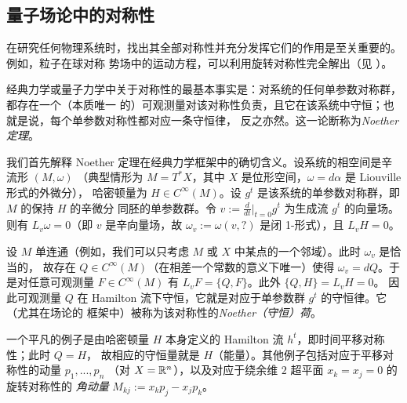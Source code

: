 
\subsection{量子场论中的对称性}

在研究任何物理系统时，找出其全部对称性并充分发挥它们的作用是至关重要的。例如，粒子在球对称
势场中的运动方程，可以利用旋转对称性完全解出（见 \cite{A}）。

经典力学或量子力学中关于对称性的最基本事实是：对系统的任何单参数对称群，都存在一个（本质唯一
的）可观测量对该对称性负责，且它在该系统中守恒；也就是说，每个单参数对称性都对应一条守恒律，
反之亦然。这一论断称为\emph{Noether 定理}。

我们首先解释 Noether 定理在经典力学框架中的确切含义。设系统的相空间是辛流形 $(M,\omega)$
（典型情形为 $M=T^*X$，其中 $X$ 是位形空间，$\omega=d\alpha$ 是 Liouville 形式的外微分），
哈密顿量为 $H\in C^\infty(M)$。设 $g^t$ 是该系统的单参数对称群，即 $M$ 的保持 $H$ 的辛微分
同胚的单参数群。令 $v:=\frac{d}{dt}|_{t=0}g^t$ 为生成流 $g^t$ 的向量场。则有
$L_v \omega=0$（即 $v$ 是辛向量场，故 $\omega_v:=\omega(v,?)$ 是闭 1-形式），且 $L_v H=0$。

设 $M$ 单连通（例如，我们可以只考虑 $M$ 或 $X$ 中某点的一个邻域）。此时 $\omega_v$ 是恰当的，
故存在 $Q\in C^\infty(M)$（在相差一个常数的意义下唯一）使得 $\omega_v=dQ$。于是对任意可观测量
$F\in C^\infty(M)$ 有 $L_vF=\lbrace Q,F\rbrace$。此外 $\lbrace Q,H\rbrace=L_vH=0$。
因此可观测量 $Q$ 在 Hamilton 流下守恒，它就是对应于单参数群 $g^t$ 的守恒律。它（尤其在场论的
框架中）被称为该对称性的\emph{Noether（守恒）荷}。

一个平凡的例子是由哈密顿量 $H$ 本身定义的 Hamilton 流 $h^t$，即时间平移对称性；此时 $Q=H$，
故相应的守恒量就是 $H$（能量）。其他例子包括对应于平移对称性的动量 $p_1,...,p_n$
（对 $X=\Bbb R^n$），以及对应于绕余维 $2$ 超平面 $x_k=x_j=0$ 的旋转对称性的
\emph{角动量} $M_{kj}:=x_kp_j-x_jp_k$。

